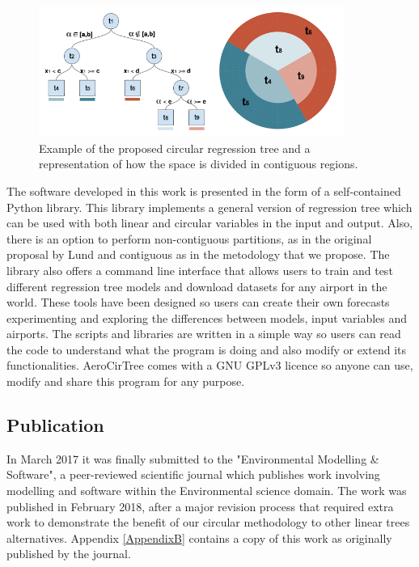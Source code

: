 \begin{figure}[h]
 \centerline{\includegraphics[width=10cm]{paper2.png}}\caption{Example of the proposed circular regression tree and a representation of how the space is divided in contiguous regions.}\label{paper2}
\end{figure}

The software developed in this work is presented in the form of a self-contained Python library. This library implements a general version of regression tree which can be used with both linear and circular variables in the input and output. Also, there is an option to perform non-contiguous partitions, as in the original proposal by Lund and contiguous as in the metodology that we propose.  The library also offers a command line interface that allows users to train and test different regression tree models and download datasets for any airport in the world. These tools have been designed so users can create their own forecasts experimenting and exploring the differences between models, input variables and airports. The scripts and libraries are written in a simple way so users can read the code to understand what the program is doing and also modify or extend its functionalities. AeroCirTree comes with a GNU GPLv3 licence so anyone can use, modify and share this program for any purpose.

\subsection{Publication}

In March 2017 it was finally submitted to the "Environmental Modelling \& Software", a peer-reviewed scientific journal which publishes work involving modelling and software within the Environmental science domain. The work was published in February 2018, after a major revision process that required extra work to demonstrate the benefit of our circular methodology to other linear trees alternatives. Appendix \ref{AppendixB} contains a copy of this work as originally published by the journal.

